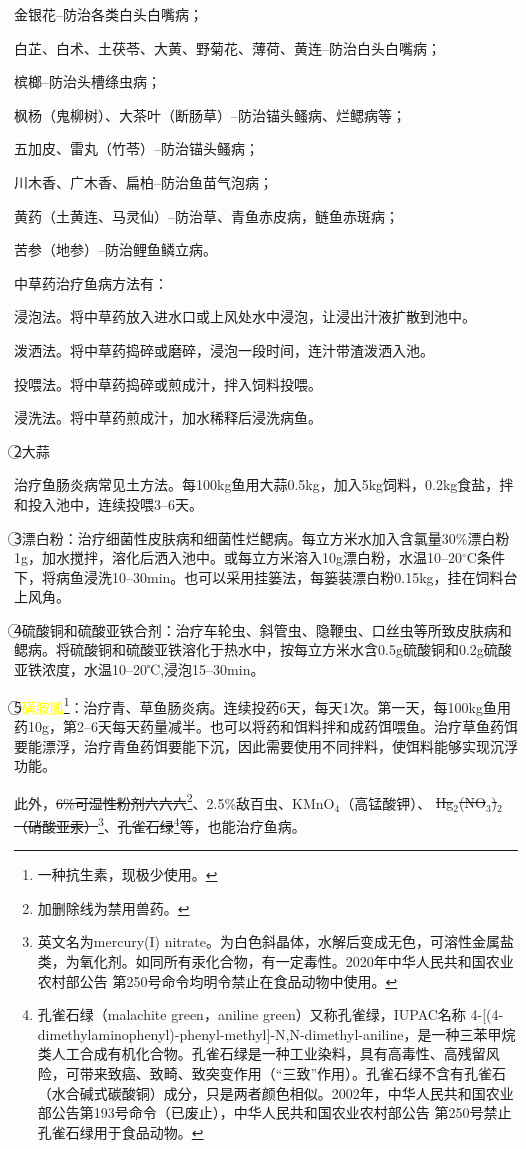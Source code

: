 \documentclass{ctexbook}
\begin{document}
金银花--防治各类白头白嘴病；

白芷、白术、土茯苓、大黄、野菊花、薄荷、黄连--防治白头白嘴病；

槟榔--防治头槽绦虫病；

枫杨（鬼柳树）、大茶叶（断肠草）--防治锚头鳋病、烂鳃病等；

五加皮、雷丸（竹苓）--防治锚头鳋病；

川木香、广木香、扁柏--防治鱼苗气泡病；

黄药（土黄连、马灵仙）--防治草、青鱼赤皮病，鲢鱼赤斑病；

苦参（地参）--防治鲤鱼鳞立病。

中草药治疗鱼病方法有：

浸泡法。将中草药放入进水口或上风处水中浸泡，让浸出汁液扩散到池中。

泼洒法。将中草药捣碎或磨碎，浸泡一段时间，连汁带渣泼洒入池。

投喂法。将中草药捣碎或煎成汁，拌入饲料投喂。

浸洗法。将中草药煎成汁，加水稀释后浸洗病鱼。

\textcircled{2}大蒜

治疗鱼肠炎病常见土方法。每100kg鱼用大蒜0.5kg，加入5kg饲料，0.2kg食盐，拌和投入池中，连续投喂3--6天。

\textcircled{3}漂白粉：治疗细菌性皮肤病和细菌性烂鳃病。每立方米水加入含氯量30\%漂白粉1g，加水搅拌，溶化后洒入池中。或每立方米溶入10g漂白粉，水温10--20$^{\circ}$C条件下，将病鱼浸洗10--30min。也可以采用挂篓法，每篓装漂白粉0.15kg，挂在饲料台上风角。

\textcircled{4}硫酸铜和硫酸亚铁合剂：治疗车轮虫、斜管虫、隐鞭虫、口丝虫等所致皮肤病和鳃病。将硫酸铜和硫酸亚铁溶化于热水中，按每立方米水含0.5g硫酸铜和0.2g硫酸亚铁浓度，水温10--20℃,浸泡15--30min。

\textcircled{5}\textcolor{yellow}{磺胺胍}\footnote{一种抗生素，现极少使用。}：治疗青、草鱼肠炎病。连续投药6天，每天1次。第一天，每100kg鱼用药10g，第2--6天每天药量减半。也可以将药和饵料拌和成药饵喂鱼。治疗草鱼药饵要能漂浮，治疗青鱼药饵要能下沉，因此需要使用不同拌料，使饵料能够实现沉浮功能。

此外，\sout{6\%可湿性粉剂六六六}\footnote{加删除线为禁用兽药。}、2.5\%敌百虫、KMnO$_4$（高锰酸钾）、\sout{ Hg$_2$(NO$_3$)$_2$（硝酸亚汞）}\footnote{英文名为mercury(I) nitrate。为白色斜晶体，水解后变成无色，可溶性金属盐类，为氧化剂。如同所有汞化合物，有一定毒性。2020年中华人民共和国农业农村部公告 第250号命令均明令禁止在食品动物中使用。}、\sout{孔雀石绿}\footnote{孔雀石绿（malachite green，aniline green）又称孔雀绿，IUPAC名称 4-[(4-dimethylaminophenyl)-phenyl-methyl]-N,N-dimethyl-aniline，是一种三苯甲烷类人工合成有机化合物。孔雀石绿是一种工业染料，具有高毒性、高残留风险，可带来致癌、致畸、致突变作用（“三致”作用）。孔雀石绿不含有孔雀石（水合碱式碳酸铜）成分，只是两者颜色相似。2002年，中华人民共和国农业部公告第193号命令（已废止），中华人民共和国农业农村部公告 第250号禁止孔雀石绿用于食品动物。}等，也能治疗鱼病。
\end{document}
